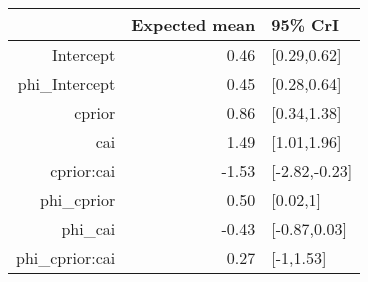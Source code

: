 \begin{tabular}{rrl}
  \hline
 & Expected mean & 95\% CrI \\ 
  \hline
Intercept & 0.46 & [0.29,0.62] \\ 
  phi\_Intercept & 0.45 & [0.28,0.64] \\ 
  cprior & 0.86 & [0.34,1.38] \\ 
  cai & 1.49 & [1.01,1.96] \\ 
  cprior:cai & -1.53 & [-2.82,-0.23] \\ 
  phi\_cprior & 0.50 & [0.02,1] \\ 
  phi\_cai & -0.43 & [-0.87,0.03] \\ 
  phi\_cprior:cai & 0.27 & [-1,1.53] \\ 
   \hline
\end{tabular}


